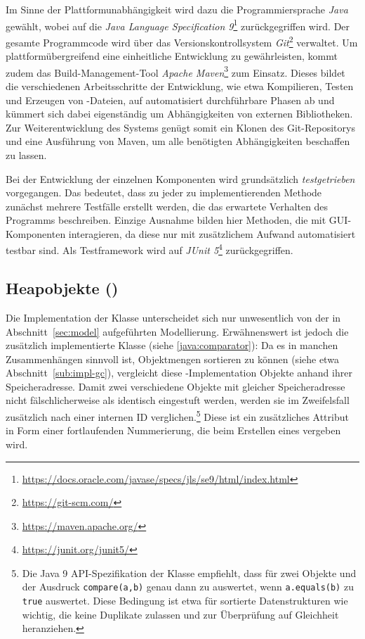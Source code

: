 Im Sinne der Plattformunabhängigkeit wird dazu die Programmiersprache \textit{Java} gewählt, wobei auf die \textit{Java Language Specification 9}\footnote{\url{https://docs.oracle.com/javase/specs/jls/se9/html/index.html}} zurückgegriffen wird.
Der gesamte Programmcode wird über das Versionskontrollsystem \textit{Git}\footnote{\url{https://git-scm.com/}} verwaltet.
Um plattformübergreifend eine einheitliche Entwicklung zu gewährleisten, kommt zudem das Build-Management-Tool \textit{Apache Maven}\footnote{\url{https://maven.apache.org/}} zum Einsatz.
Dieses bildet die verschiedenen Arbeitsschritte der Entwicklung, wie etwa Kompilieren, Testen und Erzeugen von -Dateien, auf automatisiert durchführbare Phasen ab und kümmert sich dabei eigenständig um Abhängigkeiten von externen Bibliotheken.
Zur Weiterentwicklung des Systems genügt somit ein Klonen des Git-Repositorys und eine Ausführung von Maven, um alle benötigten Abhängigkeiten beschaffen zu lassen.

Bei der Entwicklung der einzelnen Komponenten wird grundsätzlich \textit{testgetrieben} vorgegangen.
Das bedeutet, dass zu jeder zu implementierenden Methode zunächst mehrere Testfälle erstellt werden, die das erwartete Verhalten des Programms beschreiben.
Einzige Ausnahme bilden hier Methoden, die mit GUI-Komponenten interagieren, da diese nur mit zusätzlichem Aufwand automatisiert testbar sind.
Als Testframework wird auf \textit{JUnit 5}\footnote{\url{https://junit.org/junit5/}} zurückgegriffen.

\subsection{Heapobjekte ()}
\label{sub:heapobject}
Die Implementation der Klasse  unterscheidet sich nur unwesentlich von der in Abschnitt~\ref{sec:model} aufgeführten Modellierung.
Erwähnenswert ist jedoch die zusätzlich implementierte Klasse  (siehe \ref{java:comparator}):
Da es in manchen Zusammenhängen sinnvoll ist, Objektmengen sortieren zu können (siehe etwa Abschnitt~\ref{sub:impl-gc}), vergleicht diese -Implementation Objekte anhand ihrer Speicheradresse.
Damit zwei verschiedene Objekte mit gleicher Speicheradresse nicht fälschlicherweise als identisch eingestuft werden, werden sie im Zweifelsfall zusätzlich nach einer internen ID verglichen.\footnote{Die Java 9 API-Spezifikation der Klasse  empfiehlt, dass für zwei Objekte  und  der Ausdruck \texttt{compare(a,b)} genau dann zu  auswertet, wenn \texttt{a.equals(b)} zu \texttt{true} auswertet. Diese Bedingung ist etwa für sortierte Datenstrukturen wie  wichtig, die keine Duplikate zulassen und  zur Überprüfung auf Gleichheit heranziehen.}
Diese ist ein zusätzliches Attribut in Form einer fortlaufenden Nummerierung, die beim Erstellen eines  vergeben wird.


